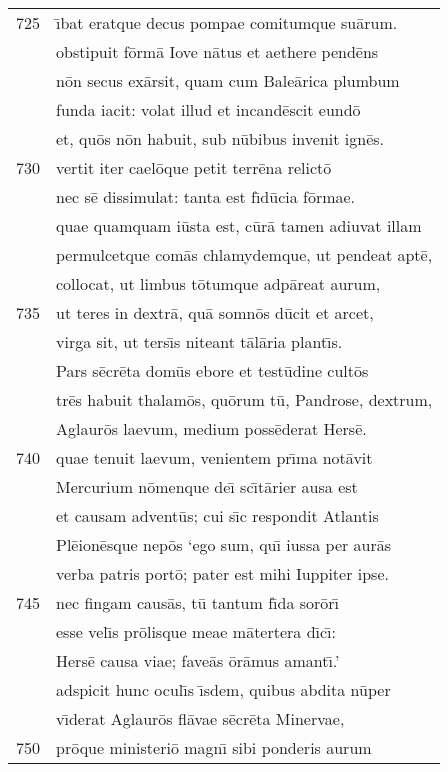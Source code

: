 \documentclass[paper=6in:9in,pagesize=pdftex,
               headinclude=on,footinclude=on,12pt]{scrbook}
\begin{document}
\begin{longtable}[p]{ r l }
725 & \={\i}bat eratque decus pompae comitumque su\=arum.\\ 
 & obstipuit f\=orm\=a Iove n\=atus et aethere pend\=ens\\ 
 & n\=on secus ex\=arsit, quam cum Bale\=arica plumbum\\ 
 & funda iacit: volat illud et incand\=escit eund\=o\\ 
 & et, qu\=os n\=on habuit, sub n\=ubibus invenit ign\=es.\\ 
730 & vertit iter cael\=oque petit terr\=ena relict\=o\\ 
 & nec s\=e dissimulat: tanta est f\={\i}d\=ucia f\=ormae.\\ 
 & quae quamquam i\=usta est, c\=ur\=a tamen adiuvat illam\\ 
 & permulcetque com\=as chlamydemque, ut pendeat apt\=e,\\ 
 & collocat, ut limbus t\=otumque adp\=areat aurum,\\ 
735 & ut teres in dextr\=a, qu\=a somn\=os d\=ucit et arcet,\\ 
 & virga sit, ut ters\={\i}s niteant t\=al\=aria plant\={\i}s.\\ 
 & \indent Pars s\=ecr\=eta dom\=us ebore et test\=udine cult\=os\\ 
 & tr\=es habuit thalam\=os, qu\=orum t\=u, Pandrose, dextrum,\\ 
 & Aglaur\=os laevum, medium poss\=ederat Hers\=e.\\ 
740 & quae tenuit laevum, venientem pr\={\i}ma not\=avit\\ 
 & Mercurium n\=omenque de\={\i} sc\={\i}t\=arier ausa est\\ 
 & et causam advent\=us; cui s\={\i}c respondit Atlantis\\ 
 & Pl\=eion\=esque nep\=os `ego sum, qu\={\i} iussa per aur\=as\\ 
 & verba patris port\=o; pater est mihi Iuppiter ipse.\\ 
745 & nec fingam caus\=as, t\=u tantum f\={\i}da sor\=or\={\i}\\ 
 & esse vel\={\i}s pr\=olisque meae m\=atertera d\={\i}c\={\i}:\\ 
 & Hers\=e causa viae; fave\=as \=or\=amus amant\={\i}.'\\ 
 & adspicit hunc ocul\={\i}s \={\i}sdem, quibus abdita n\=uper\\ 
 & v\={\i}derat Aglaur\=os fl\=avae s\=ecr\=eta Minervae,\\ 
750 & pr\=oque ministeri\=o magn\={\i} sibi ponderis aurum\\ 

\end{longtable}
\end{document}
